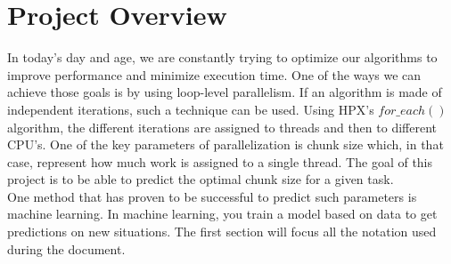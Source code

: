 \section*{Project Overview}
 In today's day and age, we are constantly trying to optimize our algorithms to improve performance and minimize execution time. One of the ways we can achieve those goals is by using loop-level parallelism. If an algorithm is made of independent iterations, such a technique can be used. Using HPX's $for\_each()$ algorithm, the different iterations are assigned to threads and then to different CPU's. One of the key parameters of parallelization is chunk size which, in that case, represent how much work is assigned to a single thread.
The goal of this project is to be able to predict the optimal chunk size for a given task. \\

One method that has proven to be successful to predict such parameters is machine learning. In machine learning, you train a model based on data to get predictions on new situations. The first section will focus all the notation used during the document.